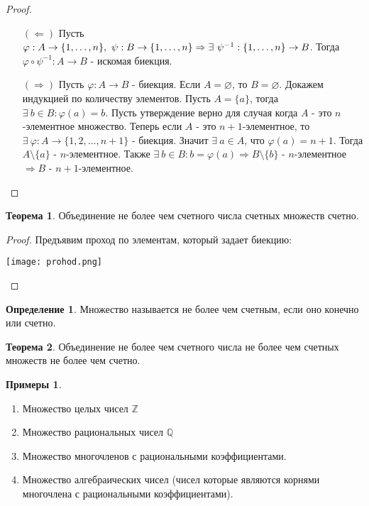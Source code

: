 \documentclass[a4paper, 12pt]{article}
\newcommand{\Z}{\mathbb{Z}}
\newcommand{\Q}{\mathbb{Q}}
\renewcommand{\phi}{\varphi}
\renewcommand{\emptyset}{\varnothing}
\newcommand\tab[1][.5cm]{\hspace*{#1}}
\theoremstyle{definition}
\newtheorem*{definition}{Определение}
\newtheorem*{theorem}{Теорема}
\newtheorem*{examples}{Примеры}
\begin{document}
        \begin{proof}\tab
            \begin{itemize}
                \item[$(\Leftarrow)$] Пусть $\phi:A\to \{1,\dots, n\}, \ \psi:B\to \{1,\dots, n\}\\
                \Rightarrow \exists \ \psi^{-1}:\{1,\dots, n\}\to B$. Тогда $\phi \circ \psi^{-1}:A\to B$ - искомая биекция.
                \item[$(\Rightarrow)$] Пусть $\phi:A\to B$ - биекция. Если $A=\emptyset$, то $B=\emptyset$. Докажем индукцией по количеству элементов. Пусть $A=\{a\}$, тогда $\exists \ b\in B: \phi(a)=b$. Пусть утверждение верно для случая когда $A$ - это $n$-элементное множество. Теперь если $A$ - это $n+1$-элементное, то $\exists \ \phi:A\to \{1,2,...,n+1\}$ - биекция. Значит $\exists \ a\in A$, что $\phi(a)=n+1$. Тогда $A\setminus\{a\}$ - $n$-элементное. Также $\exists \ b\in B: b=\phi(a) \Rightarrow B\setminus\{b\}$ - $n$-элементное $\Rightarrow  B$ - $n+1$-элементное.
            \end{itemize}
        \end{proof}
        \begin{theorem}
            Объединение не более чем счетного числа счетных множеств счетно.
        \end{theorem}
        \begin{proof}
            Предъявим проход по элементам, который задает биекцию:
            \begin{center}
                \texttt{[image: prohod.png]}
            \end{center}
        \end{proof}
        \begin{definition}
            Множество называется не более чем счетным, если оно конечно или счетно.
        \end{definition}
        \begin{theorem}
            Объединение не более чем счетного числа не более чем счетных множеств не более чем счетно.
        \end{theorem} 
        \begin{examples}\tab
            \begin{enumerate}
                \item Множество целых чисел $\Z$
                \item Множество рациональных чисел $\Q$
                \item Множество многочленов с рациональными коэффициентами.
                \item Множество алгебраических чисел (чисел которые являются корнями многочлена с рациональными коэффициентами).
            \end{enumerate}
        \end{examples}
\end{document}
